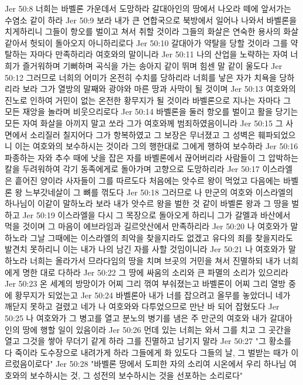 Jer 50:8  너희는 바벨론 가운데서 도망하라 갈대아인의 땅에서 나오라 떼에 앞서가는 수염소 같이 하라
Jer 50:9  보라 내가 큰 연합국으로 북방에서 일어나 나와서 바벨론을 치게하리니 그들이 항오를 벌이고 쳐서 취할 것이라 그들의 화살은 연숙한 용사의 화살 같아서 헛되이 돌아오지 아니하리로다
Jer 50:10  갈대아가 약탈을 당할 것이라 그를 약탈하는 자마다 만족하리라 여호와의 말이니라
Jer 50:11  나의 산업을 노략하는 자여 너희가 즐거워하며 기뻐하며 곡식을 가는 송아지 같이 뛰며 힘센 말 같이 울도다
Jer 50:12  그러므로 너희의 어미가 온전히 수치를 당하리라 너희를 낳은 자가 치욕을 당하리라 보라 그가 열방의 말째와 광야와 마른 땅과 사막이 될 것이며
Jer 50:13  여호와의 진노로 인하여 거민이 없는 온전한 황무지가 될 것이라 바벨론으로 지나는 자마다 그 모든 재앙을 놀라며 비웃으리로다
Jer 50:14  바벨론을 둘러 항오를 벌이고 활을 당기는 모든 자여 화살을 아끼지 말고 쏘라 그가 여호와께 범죄하였음이니라
Jer 50:15  그 사면에서 소리질러 칠지어다 그가 항복하였고 그 보장은 무너졌고 그 성벽은 훼파되었으니 이는 여호와의 보수하시는 것이라 그의 행한대로 그에게 행하여 보수하라
Jer 50:16  파종하는 자와 추수 때에 낫을 잡은 자를 바벨론에서 끊어버리라 사람들이 그 압박하는 칼을 두려워하여 각기 동족에게로 돌아가며 고향으로 도망하리라
Jer 50:17  이스라엘은 흩어진 양이라 사자들이 그를 따르도다 처음에는 앗수르 왕이 먹었고 다음에는 바벨론 왕 느부갓네살이 그 뼈를 꺾도다
Jer 50:18  그러므로 나 만군의 여호와 이스라엘의 하나님이 이같이 말하노라 보라 내가 앗수르 왕을 벌한 것 같이 바벨론 왕과 그 땅을 벌하고
Jer 50:19  이스라엘을 다시 그 목장으로 돌아오게 하리니 그가 갈멜과 바산에서 먹을 것이며 그 마음이 에브라임과 길르앗산에서 만족하리라
Jer 50:20  나 여호와가 말하노라 그날 그때에는 이스라엘의 죄악을 찾을지라도 없겠고 유다의 죄를 찾을지라도 발견치 못하리니 이는 내가 나의 남긴 자를 사할 것임이니라
Jer 50:21  나 여호와가 말하노라 너희는 올라가서 므라다임의 땅을 치며 브곳의 거민을 쳐서 진멸하되 내가 너희에게 명한 대로 다하라
Jer 50:22  그 땅에 싸움의 소리와 큰 파멸의 소리가 있으리라
Jer 50:23  온 세계의 방망이가 어찌 그리 꺾여 부숴졌는고 바벨론이 어찌 그리 열방 중에 황무지가 되었는고
Jer 50:24  바벨론아 내가 너를 잡으려고 올무를 놓았더니 네가 깨닫지 못하고 걸렸고 네가 나 여호와와 다투었으므로 만난 바 되어 잡혔도다
Jer 50:25  나 여호와가 그 병고를 열고 분노의 병기를 냄은 주 만군의 여호와 내가 갈대아인의 땅에 행할 일이 있음이라
Jer 50:26  먼데 있는 너희는 와서 그를 치고 그 곳간을 열고 그것을 쌓아 무더기 같게 하라 그를 진멸하고 남기지 말라
Jer 50:27  "그 황소를 다 죽이라 도수장으로 내려가게 하라 그들에게 화 있도다 그들의 날, 그 벌받는 때가 이르렀음이로다"
Jer 50:28  "바벨론 땅에서 도피한 자의 소리여 시온에서 우리 하나님 여호와의 보수하시는 것, 그 성전의 보수하시는 것을 선포하는 소리로다"
